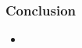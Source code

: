 \begin{frame}
    \frametitle{Conclusion}
    \begin{itemize}
        \item 
    \end{itemize}
\end{frame}